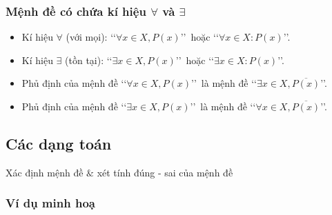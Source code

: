 \begin{tomtat}
\subsubsection{Mệnh đề có chứa kí hiệu $\forall$ và $\exists$}

\begin{itemize}
	\item Kí hiệu $\forall$ (với mọi): \lq\lq $ \forall x \in X, P(x)$\rq\rq\ hoặc \lq\lq $ \forall x \in X : P(x)$\rq\rq.
	\item Kí hiệu $\exists$ (tồn tại): \lq\lq $ \exists x \in X, P(x)$\rq\rq\ hoặc \lq\lq $ \exists x \in X : P(x)$\rq\rq.
\end{itemize}

\begin{note}\hfil
	\begin{itemize}
		\item Phủ định của mệnh đề \lq\lq $ \forall x \in X, P(x)$\rq\rq\ là mệnh đề \lq\lq $ \exists x\in X, \overline{P(x)}$\rq\rq.
		\item Phủ định của mệnh đề \lq\lq $ \exists x\in X, P(x)$\rq\rq\ là mệnh đề  \lq\lq $ \forall x\in X, \overline{P(x)}$\rq\rq.
	\end{itemize}
\end{note}

\end{tomtat}


\subsection{Các dạng toán}

\begin{dang}{Xác định mệnh đề $\&$ xét tính đúng - sai của mệnh đề}
\end{dang}

\subsubsection{Ví dụ minh hoạ}

